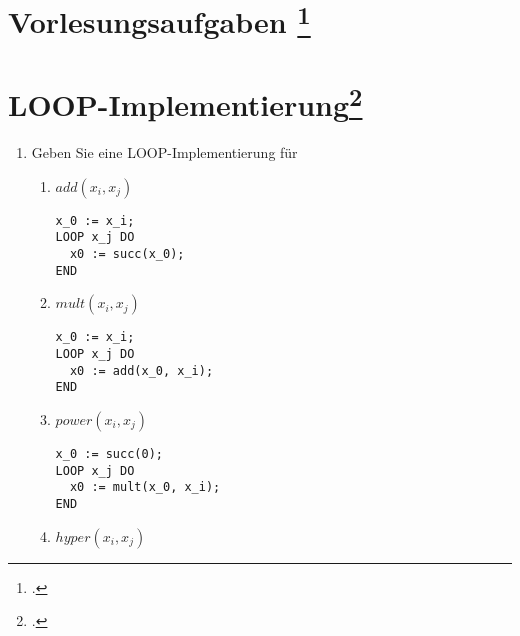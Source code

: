 \documentclass{lehramt-informatik-aufgabe}
\begin{document}
\section{Vorlesungsaufgaben
\footcite{theo:fs:4}}

%

\section{LOOP-Implementierung\footcite[Seite 11]{theo:fs:4}}

\begin{enumerate}
\item Geben Sie eine LOOP-Implementierung für

\begin{enumerate}

%

\item $add(x_i, x_j)$

\begin{liAntwort}
\begin{verbatim}
x_0 := x_i;
LOOP x_j DO
  x0 := succ(x_0);
END
\end{verbatim}
\end{liAntwort}

%

\item $mult(x_i, x_j)$

\begin{liAntwort}
\begin{verbatim}
x_0 := x_i;
LOOP x_j DO
  x0 := add(x_0, x_i);
END
\end{verbatim}
\end{liAntwort}

%

\item $power(x_i, x_j)$

\begin{liAntwort}
\begin{verbatim}
x_0 := succ(0);
LOOP x_j DO
  x0 := mult(x_0, x_i);
END
\end{verbatim}
\end{liAntwort}

%

\item $hyper(x_i, x_j)$


\end{enumerate}
\end{enumerate}
\end{document}
